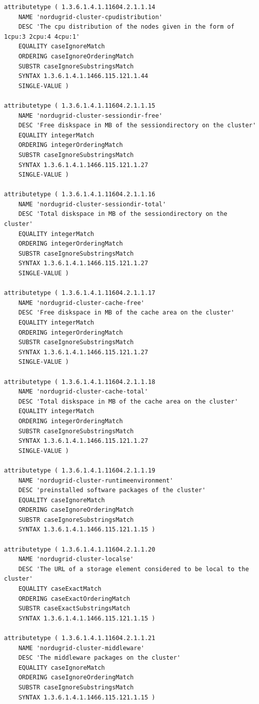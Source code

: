 \documentclass{article}
\begin{document}
\begin{verbatim}
attributetype ( 1.3.6.1.4.1.11604.2.1.1.14
    NAME 'nordugrid-cluster-cpudistribution'
    DESC 'The cpu distribution of the nodes given in the form of 1cpu:3 2cpu:4 4cpu:1'
    EQUALITY caseIgnoreMatch
    ORDERING caseIgnoreOrderingMatch
    SUBSTR caseIgnoreSubstringsMatch
    SYNTAX 1.3.6.1.4.1.1466.115.121.1.44
    SINGLE-VALUE )
    
attributetype ( 1.3.6.1.4.1.11604.2.1.1.15
    NAME 'nordugrid-cluster-sessiondir-free'
    DESC 'Free diskspace in MB of the sessiondirectory on the cluster'
    EQUALITY integerMatch
    ORDERING integerOrderingMatch
    SUBSTR caseIgnoreSubstringsMatch
    SYNTAX 1.3.6.1.4.1.1466.115.121.1.27
    SINGLE-VALUE )
    
attributetype ( 1.3.6.1.4.1.11604.2.1.1.16
    NAME 'nordugrid-cluster-sessiondir-total'
    DESC 'Total diskspace in MB of the sessiondirectory on the cluster'
    EQUALITY integerMatch
    ORDERING integerOrderingMatch
    SUBSTR caseIgnoreSubstringsMatch
    SYNTAX 1.3.6.1.4.1.1466.115.121.1.27
    SINGLE-VALUE )

attributetype ( 1.3.6.1.4.1.11604.2.1.1.17
    NAME 'nordugrid-cluster-cache-free'
    DESC 'Free diskspace in MB of the cache area on the cluster'
    EQUALITY integerMatch
    ORDERING integerOrderingMatch
    SUBSTR caseIgnoreSubstringsMatch
    SYNTAX 1.3.6.1.4.1.1466.115.121.1.27
    SINGLE-VALUE )
    
attributetype ( 1.3.6.1.4.1.11604.2.1.1.18
    NAME 'nordugrid-cluster-cache-total'
    DESC 'Total diskspace in MB of the cache area on the cluster'
    EQUALITY integerMatch
    ORDERING integerOrderingMatch
    SUBSTR caseIgnoreSubstringsMatch
    SYNTAX 1.3.6.1.4.1.1466.115.121.1.27
    SINGLE-VALUE )

attributetype ( 1.3.6.1.4.1.11604.2.1.1.19
    NAME 'nordugrid-cluster-runtimeenvironment'
    DESC 'preinstalled software packages of the cluster'
    EQUALITY caseIgnoreMatch
    ORDERING caseIgnoreOrderingMatch
    SUBSTR caseIgnoreSubstringsMatch
    SYNTAX 1.3.6.1.4.1.1466.115.121.1.15 )

attributetype ( 1.3.6.1.4.1.11604.2.1.1.20
    NAME 'nordugrid-cluster-localse'
    DESC 'The URL of a storage element considered to be local to the cluster'
    EQUALITY caseExactMatch
    ORDERING caseExactOrderingMatch
    SUBSTR caseExactSubstringsMatch
    SYNTAX 1.3.6.1.4.1.1466.115.121.1.15 )  

attributetype ( 1.3.6.1.4.1.11604.2.1.1.21
    NAME 'nordugrid-cluster-middleware'
    DESC 'The middleware packages on the cluster'
    EQUALITY caseIgnoreMatch
    ORDERING caseIgnoreOrderingMatch
    SUBSTR caseIgnoreSubstringsMatch
    SYNTAX 1.3.6.1.4.1.1466.115.121.1.15 )
    

\end{verbatim}
\end{document}
